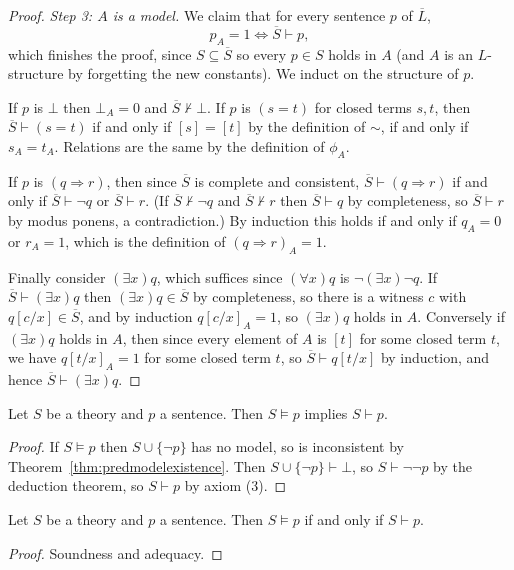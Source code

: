 \documentclass[a4paper]{scrartcl}
\begin{document}
\begin{proof}
  \emph{Step 3: $A$ is a model.} We claim that for every sentence $p$ of $\overline L$,
  $$p_A = 1 \iff \overline S \vdash p,$$
  which finishes the proof, since $S \subseteq \overline S$ so every $p \in S$ holds in $A$ (and $A$ is an $L$-structure by forgetting the new constants). We induct on the structure of $p$.

  If $p$ is $\bot$ then $\bot_A = 0$ and $\overline S \not\vdash \bot$. If $p$ is $(s = t)$ for closed terms $s, t$, then $\overline S \vdash (s=t)$ if and only if $[s] = [t]$ by the definition of $\sim$, if and only if $s_A = t_A$. Relations are the same by the definition of $\phi_A$.

  If $p$ is $(q \Rightarrow r)$, then since $\overline{S}$ is complete and consistent, $\overline S \vdash (q \Rightarrow r)$ if and only if $\overline S \vdash \lnot q$ or $\overline S \vdash r$. (If $\overline S \not\vdash \lnot q$ and $\overline S \not\vdash r$ then $\overline S \vdash q$ by completeness, so $\overline S \vdash r$ by modus ponens, a contradiction.) By induction this holds if and only if $q_A = 0$ or $r_A = 1$, which is the definition of $(q \Rightarrow r)_A = 1$.

  Finally consider $(\exists x)q$, which suffices since $(\forall x) q$ is $\lnot(\exists x)\lnot q$. If $\overline S \vdash (\exists x)q$ then $(\exists x) q \in \overline S$ by completeness, so there is a witness $c$ with $q[c/x] \in \overline S$, and by induction $q[c/x]_A = 1$, so $(\exists x)q$ holds in $A$. Conversely if $(\exists x) q$ holds in $A$, then since every element of $A$ is $[t]$ for some closed term $t$, we have $q[t/x]_A = 1$ for some closed term $t$, so $\overline S \vdash q[t/x]$ by induction, and hence $\overline S \vdash (\exists x)q$.
\end{proof}

\begin{corollary}[Adequacy]
  Let $S$ be a theory and $p$ a sentence. Then $S \models p$ implies $S \vdash p$.
\end{corollary}
\begin{proof}
  If $S \models p$ then $S \cup \{\lnot p\}$ has no model, so is inconsistent by Theorem~\ref{thm:predmodelexistence}. Then $S \cup \{\lnot p\} \vdash \bot$, so $S \vdash \lnot \lnot p$ by the deduction theorem, so $S \vdash p$ by axiom (3).
\end{proof}

\begin{theorem}
  Let $S$ be a theory and $p$ a sentence. Then $S \models p$ if and only if $S \vdash p$.
\end{theorem}
\begin{proof}
  Soundness and adequacy.
\end{proof}
\end{document}
